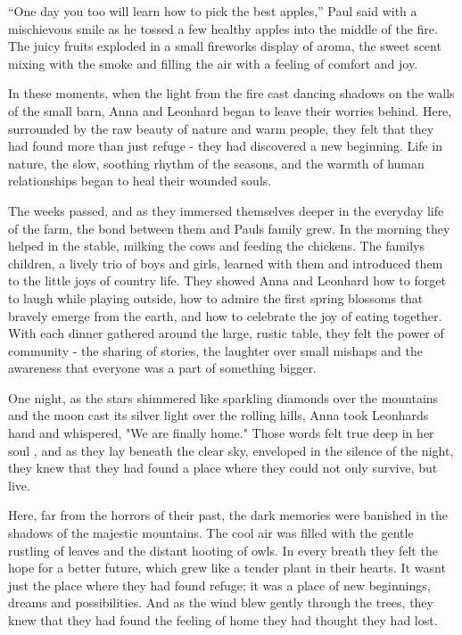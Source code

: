 \documentclass[
]{article}
\begin{document}
``One day you too will learn how to pick the best apples,'' Paul said
with a mischievous smile as he tossed a few healthy apples into the
middle of the fire. The juicy fruits exploded in a small fireworks
display of aroma, the sweet scent mixing with the smoke and filling the
air with a feeling of comfort and joy.

In these moments, when the light from the fire cast dancing shadows on
the walls of the small barn, Anna and Leonhard began to leave their
worries behind. Here, surrounded by the raw beauty of nature and warm
people, they felt that they had found more than just refuge - they had
discovered a new beginning. Life in nature, the slow, soothing rhythm of
the seasons, and the warmth of human relationships began to heal their
wounded souls.

The weeks passed, and as they immersed themselves deeper in the everyday
life of the farm, the bond between them and Paul\textquotesingle s
family grew. In the morning they helped in the stable, milking the cows
and feeding the chickens. The family\textquotesingle s children, a
lively trio of boys and girls, learned with them and introduced them to
the little joys of country life. They showed Anna and Leonhard how to
forget to laugh while playing outside, how to admire the first spring
blossoms that bravely emerge from the earth, and how to celebrate the
joy of eating together. With each dinner gathered around the large,
rustic table, they felt the power of community - the sharing of stories,
the laughter over small mishaps and the awareness that everyone was a
part of something bigger.

One night, as the stars shimmered like sparkling diamonds over the
mountains and the moon cast its silver light over the rolling hills,
Anna took Leonhard\textquotesingle s hand and whispered, "We are finally
home." Those words felt true deep in her soul , and as they lay beneath
the clear sky, enveloped in the silence of the night, they knew that
they had found a place where they could not only survive, but live.

Here, far from the horrors of their past, the dark memories were
banished in the shadows of the majestic mountains. The cool air was
filled with the gentle rustling of leaves and the distant hooting of
owls. In every breath they felt the hope for a better future, which grew
like a tender plant in their hearts. It wasn\textquotesingle t just the
place where they had found refuge; it was a place of new beginnings,
dreams and possibilities. And as the wind blew gently through the trees,
they knew that they had found the feeling of home they had thought they
had lost.
\end{document}
